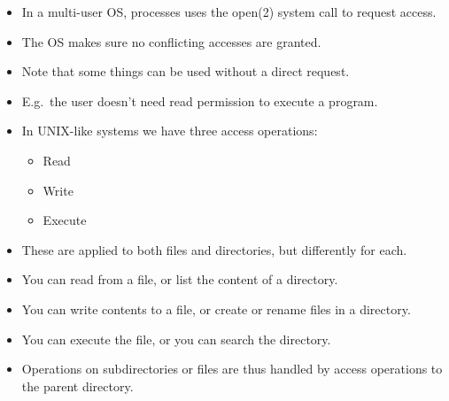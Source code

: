 
\begin{frame}
  \begin{example}
    \begin{itemize}
      \item In a multi-user OS, processes uses the open(2) system call to request 
        access.

      \item The OS makes sure no conflicting accesses are granted.

      \item Note that some things can be used without a direct request.

      \item E.g.\ the user doesn't need read permission to execute a program.

    \end{itemize}
  \end{example}
\end{frame}

\begin{frame}
  \begin{example}
    \begin{itemize}
      \item In UNIX-like systems we have three access operations:
        \begin{itemize}
          \item Read
          \item Write
          \item Execute
        \end{itemize}

      \item These are applied to both files and directories, but differently for 
        each.

      \item You can read from a file, or list the content of a directory.

      \item You can write contents to a file, or create or rename files in 
        a directory.

      \item You can execute the file, or you can search the directory.

      \item Operations on subdirectories or files are thus handled by access 
        operations to the parent directory.

    \end{itemize}
  \end{example}
\end{frame}

